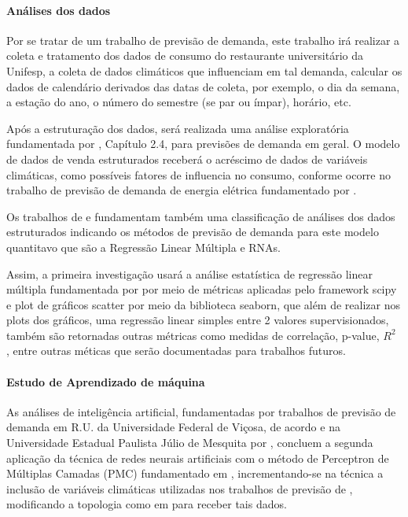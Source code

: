 \documentclass[	12pt, Times, openright, twoside, a4paper, english, brazil]{abntex2}
\begin{document}
        \paragraph*{Análises dos dados}

          Por se tratar de um trabalho de previsão de demanda,  este trabalho irá realizar a coleta e tratamento dos dados de consumo do restaurante universitário da Unifesp, a coleta de dados climáticos que influenciam em tal demanda, calcular os dados de calendário derivados das datas de coleta, por exemplo, o dia da semana, a estação do ano, o número do semestre (se par ou ímpar), horário, etc.

          Após a estruturação dos dados, será realizada uma análise exploratória fundamentada por \cite{Junior2007}, Capítulo 2.4, para previsões de demanda em geral.
          O modelo de dados de venda estruturados receberá o acréscimo de dados de variáveis climáticas, como possíveis fatores de influencia no consumo, conforme ocorre no trabalho de previsão de demanda de energia elétrica fundamentado por \cite{Almeida2013,RUAS2012,Silva2010}.

          Os trabalhos de \cite{Junior2007} e \cite{Silva2010} fundamentam também uma classificação de análises dos dados estruturados indicando os métodos de previsão de demanda para este modelo quantitavo que são a Regressão Linear Múltipla e RNAs.

          Assim, a primeira investigação usará a análise estatística de regressão linear múltipla fundamentada por \cite{Clarice2011} por meio de métricas aplicadas pelo framework scipy e plot de gráficos scatter por meio da biblioteca seaborn, que além de realizar nos plots dos gráficos, uma regressão linear simples entre 2 valores supervisionados, também são retornadas outras métricas como medidas de correlação, p-value, $R^2$ , entre outras méticas que serão documentadas para trabalhos futuros.

        \paragraph*{Estudo de Aprendizado de máquina}
          As análises de inteligência artificial, fundamentadas por trabalhos de previsão de demanda em R.U. da Universidade Federal de Viçosa, de acordo \cite{Lopes2008} e na Universidade Estadual Paulista Júlio de Mesquita por \cite{Rocha2011}, concluem a segunda aplicação da técnica de redes neurais artificiais com o método de Perceptron de Múltiplas Camadas (PMC) fundamentado em \cite{Haykin1994}, incrementando-se na técnica a inclusão de variáveis climáticas utilizadas nos trabalhos de previsão de  \cite{Almeida2013, RUAS2012, Silva2010}, modificando a topologia como em \cite{Lopes2008} para receber tais dados. 
\end{document}
